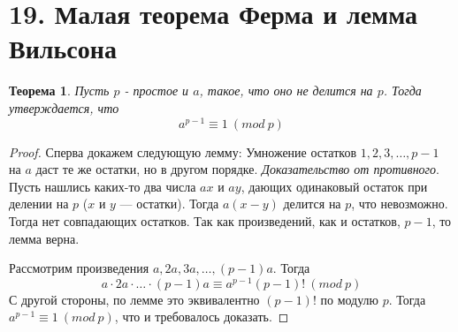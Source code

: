 \documentclass[a4paper,12pt]{article}
\newtheorem*{ther}{Теорема}
\begin{document}
        \section*{19. Малая теорема Ферма и лемма Вильсона}
        \begin{ther}
            Пусть $p$ - простое и $a$, такое, что оно не делится на $p$. Тогда утверждается, что 
            \[
                a^{p - 1} \equiv 1 \ (mod \ p)
            \]
        \end{ther}
    
        \begin{proof}
            Сперва докажем следующую лемму: Умножение остатков $1, 2, 3, \ldots , p - 1$
            на $a$ даст те же остатки, но в другом порядке.
            \textit{Доказательство от противного}. Пусть нашлись каких-то два числа $ax$ и $ay$, дающих одинаковый
            остаток при делении на $p$ ($x$ и $y$ — остатки). Тогда $a(x - y)$ делится на $p$, что невозможно. Тогда
            нет совпадающих остатков. Так как произведений, как и остатков, $p - 1$, то лемма верна.
            
            
            Рассмотрим произведения $a, 2a, 3a, \ldots, (p - 1)a$. Тогда
            \[
            a \cdot 2a \cdot \ldots \cdot (p-1)a \equiv a^{p - 1}(p - 1)! \ (mod \ p)
            \]
            С другой стороны, по лемме это эквивалентно $(p - 1)!$ по модулю $p$. Тогда $a^{p-1} \equiv 1 \ (mod \ p)$, что и
            требовалось доказать.
        \end{proof}
\end{document}
